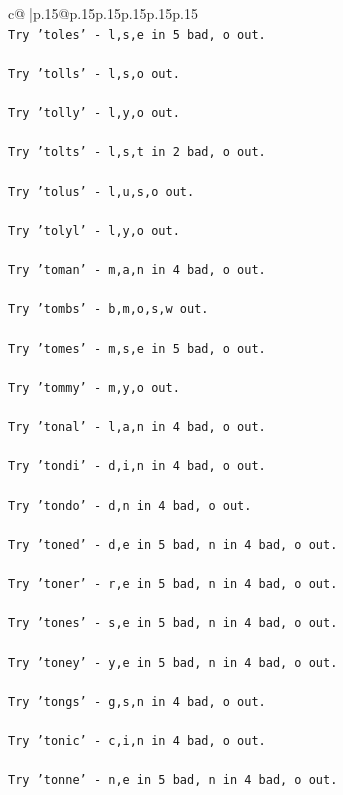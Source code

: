 \documentclass{article}
\begin{document}
{\begin{supertabular}{c@{$\;$}|p{.15\linewidth}@{}p{.15\linewidth}p{.15\linewidth}p{.15\linewidth}p{.15\linewidth}p{.15\linewidth}}
{{{\\ 
\texttt{Try 'toles' {-} l,s,e in 5 bad, o out.} \\
\\ 
\texttt{Try 'tolls' {-} l,s,o out.} \\
\\ 
\texttt{Try 'tolly' {-} l,y,o out.} \\
\\ 
\texttt{Try 'tolts' {-} l,s,t in 2 bad, o out.} \\
\\ 
\texttt{Try 'tolus' {-} l,u,s,o out.} \\
\\ 
\texttt{Try 'tolyl' {-} l,y,o out.} \\
\\ 
\texttt{Try 'toman' {-} m,a,n in 4 bad, o out.} \\
\\ 
\texttt{Try 'tombs' {-} b,m,o,s,w out.} \\
\\ 
\texttt{Try 'tomes' {-} m,s,e in 5 bad, o out.} \\
\\ 
\texttt{Try 'tommy' {-} m,y,o out.} \\
\\ 
\texttt{Try 'tonal' {-} l,a,n in 4 bad, o out.} \\
\\ 
\texttt{Try 'tondi' {-} d,i,n in 4 bad, o out.} \\
\\ 
\texttt{Try 'tondo' {-} d,n in 4 bad, o out.} \\
\\ 
\texttt{Try 'toned' {-} d,e in 5 bad, n in 4 bad, o out.} \\
\\ 
\texttt{Try 'toner' {-} r,e in 5 bad, n in 4 bad, o out.} \\
\\ 
\texttt{Try 'tones' {-} s,e in 5 bad, n in 4 bad, o out.} \\
\\ 
\texttt{Try 'toney' {-} y,e in 5 bad, n in 4 bad, o out.} \\
\\ 
\texttt{Try 'tongs' {-} g,s,n in 4 bad, o out.} \\
\\ 
\texttt{Try 'tonic' {-} c,i,n in 4 bad, o out.} \\
\\ 
\texttt{Try 'tonne' {-} n,e in 5 bad, n in 4 bad, o out.} \\
}}}
\end{supertabular}}
\end{document}
